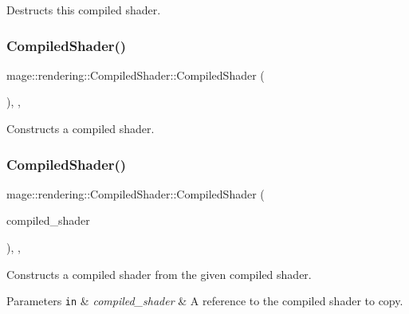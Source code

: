 Destructs this compiled shader. \hypertarget{classmage_1_1rendering_1_1_compiled_shader_a4e62e8d016992f4d7d51297d3796d05d}{}\label{classmage_1_1rendering_1_1_compiled_shader_a4e62e8d016992f4d7d51297d3796d05d} 
\subsubsection{\texorpdfstring{Compiled\+Shader()}{CompiledShader()}\hspace{0.1cm}{\footnotesize\ttfamily [1/3]}}
{\footnotesize\ttfamily mage\+::rendering\+::\+Compiled\+Shader\+::\+Compiled\+Shader (\begin{DoxyParamCaption}{ }\end{DoxyParamCaption})\hspace{0.3cm}{\ttfamily [protected]}, {\ttfamily [default]}, {\ttfamily [noexcept]}}

Constructs a compiled shader. \hypertarget{classmage_1_1rendering_1_1_compiled_shader_a13ebfdc6d2d9ba554160829a83244e8b}{}\label{classmage_1_1rendering_1_1_compiled_shader_a13ebfdc6d2d9ba554160829a83244e8b} 
\subsubsection{\texorpdfstring{Compiled\+Shader()}{CompiledShader()}\hspace{0.1cm}{\footnotesize\ttfamily [2/3]}}
{\footnotesize\ttfamily mage\+::rendering\+::\+Compiled\+Shader\+::\+Compiled\+Shader (\begin{DoxyParamCaption}\item[{const \hyperlink{classmage_1_1rendering_1_1_compiled_shader}{Compiled\+Shader} \&}]{compiled\+\_\+shader }\end{DoxyParamCaption})\hspace{0.3cm}{\ttfamily [protected]}, {\ttfamily [default]}, {\ttfamily [noexcept]}}

Constructs a compiled shader from the given compiled shader.


\begin{DoxyParams}[1]{Parameters}
\mbox{\tt in}  & {\em compiled\+\_\+shader} & A reference to the compiled shader to copy. \\
\hline
\end{DoxyParams}
\hypertarget{classmage_1_1rendering_1_1_compiled_shader_a20a7e1e0b2e9bf378aeda9bf8e429c43}{}\label{classmage_1_1rendering_1_1_compiled_shader_a20a7e1e0b2e9bf378aeda9bf8e429c43} 
